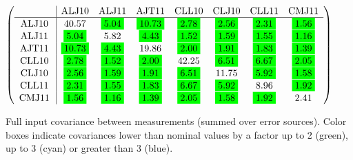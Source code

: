 \begin{table}[H]
\scriptsize
\begin{center}
\renewcommand{\arraystretch}{1.1}
\begin{math}\left(\begin{array}{c|ccccccc}
 & \mathrm{ALJ10} & 
\mathrm{ALJ11} & 
\mathrm{AJT11} & 
\mathrm{CLL10} & 
\mathrm{CLJ10} & 
\mathrm{CLL11} & 
\mathrm{CMJ11} \\
\hline
\mathrm{ALJ10} \hspace*{2pt} &      40.57 &  \colorbox{Green1}{$      5.04$} &  \colorbox{Green1}{$     10.73$} &  \colorbox{Green1}{$      2.78$} &  \colorbox{Green1}{$      2.56$} &  \colorbox{Green1}{$      2.31$} &  \colorbox{Green1}{$      1.56$} \\
\mathrm{ALJ11} \hspace*{2pt} &  \colorbox{Green1}{$      5.04$} &       5.82 &  \colorbox{Green1}{$      4.43$} &  \colorbox{Green1}{$      1.52$} &  \colorbox{Green1}{$      1.59$} &  \colorbox{Green1}{$      1.55$} &  \colorbox{Green1}{$      1.16$} \\
\mathrm{AJT11} \hspace*{2pt} &  \colorbox{Green1}{$     10.73$} &  \colorbox{Green1}{$      4.43$} &      19.86 &  \colorbox{Green1}{$      2.00$} &  \colorbox{Green1}{$      1.91$} &  \colorbox{Green1}{$      1.83$} &  \colorbox{Green1}{$      1.39$} \\
\mathrm{CLL10} \hspace*{2pt} &  \colorbox{Green1}{$      2.78$} &  \colorbox{Green1}{$      1.52$} &  \colorbox{Green1}{$      2.00$} &      42.25 &  \colorbox{Green1}{$      6.51$} &  \colorbox{Green1}{$      6.67$} &  \colorbox{Green1}{$      2.05$} \\
\mathrm{CLJ10} \hspace*{2pt} &  \colorbox{Green1}{$      2.56$} &  \colorbox{Green1}{$      1.59$} &  \colorbox{Green1}{$      1.91$} &  \colorbox{Green1}{$      6.51$} &      11.75 &  \colorbox{Green1}{$      5.92$} &  \colorbox{Green1}{$      1.58$} \\
\mathrm{CLL11} \hspace*{2pt} &  \colorbox{Green1}{$      2.31$} &  \colorbox{Green1}{$      1.55$} &  \colorbox{Green1}{$      1.83$} &  \colorbox{Green1}{$      6.67$} &  \colorbox{Green1}{$      5.92$} &       8.96 &  \colorbox{Green1}{$      1.92$} \\
\mathrm{CMJ11} \hspace*{2pt} &  \colorbox{Green1}{$      1.56$} &  \colorbox{Green1}{$      1.16$} &  \colorbox{Green1}{$      1.39$} &  \colorbox{Green1}{$      2.05$} &  \colorbox{Green1}{$      1.58$} &  \colorbox{Green1}{$      1.92$} &       2.41 \\
\end{array}\right)\end{math}
\caption{Full input covariance between measurements (summed over error sources). Color boxes indicate covariances lower than nominal values by a factor up to 2 (green), up to 3 (cyan) or greater than 3 (blue).}
\renewcommand{\arraystretch}{1}
\end{center}
\end{table}
